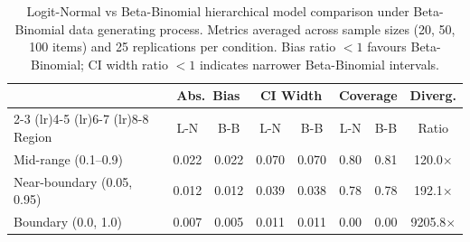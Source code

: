\begin{table}[h]
\centering
\caption{Logit-Normal vs Beta-Binomial hierarchical model comparison under Beta-Binomial data generating process. Metrics averaged across sample sizes (20, 50, 100 items) and 25 replications per condition. Bias ratio $<1$ favours Beta-Binomial; CI width ratio $<1$ indicates narrower Beta-Binomial intervals.}
\label{tab:model_comparison}
\small
\begin{tabular}{@{}l cc cc cc c@{}}
\toprule
 & \multicolumn{2}{c}{Abs.\ Bias} & \multicolumn{2}{c}{CI Width} & \multicolumn{2}{c}{Coverage} & Diverg. \\
\cmidrule(lr){2-3} \cmidrule(lr){4-5} \cmidrule(lr){6-7} \cmidrule(lr){8-8}
Region & L-N & B-B & L-N & B-B & L-N & B-B & Ratio \\
\midrule
Mid-range (0.1--0.9) & 0.022 & 0.022 & 0.070 & 0.070 & 0.80 & 0.81 & 120.0$\times$ \\
Near-boundary (0.05, 0.95) & 0.012 & 0.012 & 0.039 & 0.038 & 0.78 & 0.78 & 192.1$\times$ \\
Boundary (0.0, 1.0) & 0.007 & 0.005 & 0.011 & 0.011 & 0.00 & 0.00 & 9205.8$\times$ \\
\bottomrule
\end{tabular}
\end{table}